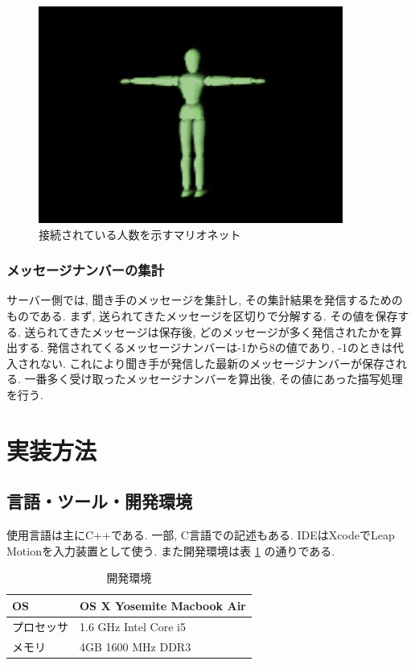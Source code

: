 \documentclass{funthesis}
\begin{document}
\begin{figure}[H]
 \begin{center}
  \includegraphics[width=100mm]{./img/marionet.png}
 \end{center}
 \caption{接続されている人数を示すマリオネット}
 \label{mario}
\end{figure}


\subsubsection{メッセージナンバーの集計}
サーバー側では, 聞き手のメッセージを集計し,  その集計結果を発信するためのものである.
まず, 送られてきたメッセージを区切りで分解する. その値を保存する.
送られてきたメッセージは保存後, どのメッセージが多く発信されたかを算出する. 発信されてくるメッセージナンバーは-1から8の値であり, -1のときは代入されない. これにより聞き手が発信した最新のメッセージナンバーが保存される. 一番多く受け取ったメッセージナンバーを算出後, その値にあった描写処理を行う.  

\section{実装方法}

\subsection{言語・ツール・開発環境}
使用言語は主にC++である. 一部, C言語での記述もある. IDEはXcodeでLeap Motionを入力装置として使う. また開発環境は表 \ref{env} の通りである. 

\begin{table}[H]
\begin{center}
\caption{開発環境}
  \begin{tabular}{ll}
  
   \hline
OS & OS X  Yosemite Macbook Air \\ 
  \hline
プロセッサ & 1.6 GHz Intel Core i5\\ 
  \hline
メモリ & 4GB 1600 MHz DDR3\\ 
  \hline
  \end{tabular}
  \label{env}
  \end{center}
\end{table}
\end{document}
